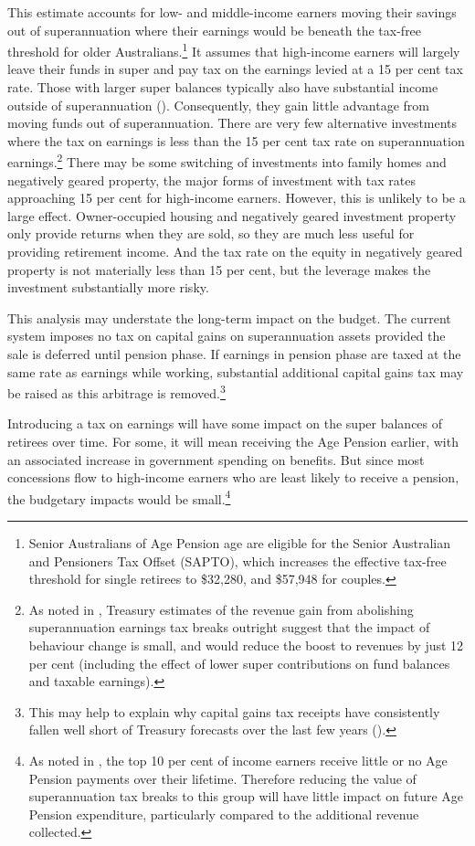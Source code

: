 This estimate accounts for low- and middle-income earners moving their savings out of superannuation where their earnings would be beneath the tax-free threshold for older Australians.\footnote{Senior Australians of Age Pension age are eligible for the Senior Australian and Pensioners Tax Offset (SAPTO), which increases the effective tax-free threshold for single retirees to \$32,280, and \$57,948 for couples.}  It assumes that high-income earners will largely leave their funds in super and pay tax on the earnings levied at a 15 per cent tax rate. Those with larger super balances typically also have substantial income outside of superannuation (). Consequently, they gain little advantage from moving funds out of superannuation. There are very few alternative investments where the tax on earnings is less than the 15 per cent tax rate on superannuation earnings.\footnote{As noted in , Treasury estimates of the revenue gain from abolishing superannuation earnings tax breaks outright suggest that the impact of behaviour change is small, and would reduce the boost to revenues by just 12 per cent (including the effect of lower super contributions on fund balances and taxable earnings).}  There may be some switching of investments into family homes and negatively geared property, the major forms of investment with tax rates approaching 15 per cent for high-income earners. However, this is unlikely to be a large effect. Owner-occupied housing and negatively geared investment property only provide returns when they are sold, so they are much less useful for providing retirement income. And the tax rate on the equity in negatively geared property is not materially less than 15 per cent, but the leverage makes the investment substantially more risky.  

This analysis may understate the long-term impact on the budget. The current system imposes no tax on capital gains on superannuation assets provided the sale is deferred until pension phase. If earnings in pension phase are taxed at the same rate as earnings while working, substantial additional capital gains tax may be raised as this arbitrage is removed.\footnote{This may help to explain why capital gains tax receipts have consistently fallen well short of Treasury forecasts over the last few years (\textcite[][51]{Treasury2012ReviewMacroRevenueForecasts}).}

Introducing a tax on earnings will have some impact on the super balances of retirees over time. For some, it will mean receiving the Age Pension earlier, with an associated increase in government spending on benefits. But since most concessions flow to high-income earners who are least likely to receive a pension, the budgetary impacts would be small.\footnote{As noted in , the top 10 per cent of income earners receive little or no Age Pension payments over their lifetime. Therefore reducing the value of superannuation tax breaks to this group will have little impact on future Age Pension expenditure, particularly compared to the additional revenue collected.} 

